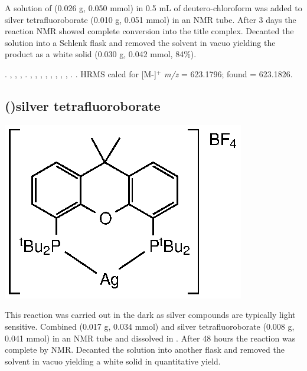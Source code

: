 A solution of \tButhixantphos{} (0.026 g, 0.050 mmol) in 0.5 mL of deutero-chloroform was added to silver tetrafluoroborate (0.010 g, 0.051 mmol) in an NMR tube.  After 3 days the reaction NMR showed complete conversion into the title complex.  Decanted the solution into a Schlenk flask and removed the solvent in vacuo yielding the product as a white solid (0.030 g, 0.042 mmol, 84\%).

.
,
,
,
.
,
,
,
,
,
, %
,
,
.
.
HRMS calcd for  [M-]$^+$ \emph{m/z} = 623.1796; found = 623.1826.



\subsection*{(\tBuXantphos)silver tetrafluoroborate} %

\begin{structure}[h]
\begin{center}
\includegraphics{../Structures/CtBuSilverBF4.eps}
\end{center}
\end{structure}
This reaction was carried out in the dark as silver compounds are typically light sensitive.  Combined \tBuxantphos{} (0.017 g, 0.034 mmol) and silver tetrafluoroborate (0.008 g, 0.041 mmol) in an NMR tube and dissolved in .  After 48 hours the reaction was complete by NMR.  Decanted the solution into another flask and removed the solvent in vacuo yielding a white solid in quantitative yield.  


